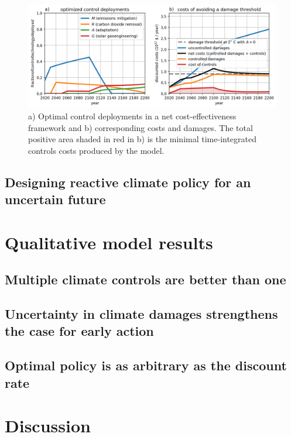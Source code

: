 \documentclass{article}
\begin{document}
\begin{figure}[htb!]
\noindent\includegraphics[width=1.0\textwidth]{figures/default-temp_controls_and_damages.png}
\centering
\caption{a) Optimal control deployments in a net cost-effectiveness framework and b) corresponding costs and damages. The total positive area shaded in red in b) is the minimal time-integrated controls costs produced by the model.}
\label{fig.approach2}
\end{figure}

\subsection{Designing reactive climate policy for an uncertain future}

\section{Qualitative model results}

\subsection{Multiple climate controls are better than one}

\subsection{Uncertainty in climate damages strengthens the case for early action}

\subsection{Optimal policy is as arbitrary as the discount rate}

\section{Discussion}



%

\end{document}
